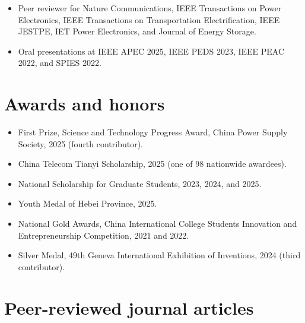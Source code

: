 \documentclass[10pt,a4paper]{article}
\begin{document}
\begin{itemize}\item Peer reviewer for Nature Communications, IEEE Transactions on Power Electronics, IEEE Transactions on Transportation Electrification, IEEE JESTPE, IET Power Electronics, and Journal of Energy Storage.\end{itemize}

\begin{itemize}\item Oral presentations at IEEE APEC 2025, IEEE PEDS 2023, IEEE PEAC 2022, and SPIES 2022.\end{itemize}

\section*{Awards and honors}

\begin{itemize}\item First Prize, Science and Technology Progress Award, China Power Supply Society, 2025 (fourth contributor).\end{itemize}

\begin{itemize}\item China Telecom Tianyi Scholarship, 2025 (one of 98 nationwide awardees).\end{itemize}

\begin{itemize}\item National Scholarship for Graduate Students, 2023, 2024, and 2025.\end{itemize}

\begin{itemize}\item Youth Medal of Hebei Province, 2025.\end{itemize}

\begin{itemize}\item National Gold Awards, China International College Students Innovation and Entrepreneurship Competition, 2021 and 2022.\end{itemize}

\begin{itemize}\item Silver Medal, 49th Geneva International Exhibition of Inventions, 2024 (third contributor).\end{itemize}

\section*{Peer-reviewed journal articles}
\end{document}
